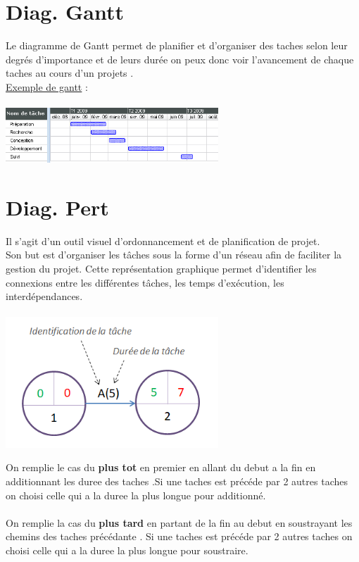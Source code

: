 \documentclass[a4paper,12pt,openany]{book}
\begin{document}
\chapter{Diag. Gantt}
Le diagramme de Gantt permet de planifier et d'organiser des taches selon leur degrés d'importance et de leurs durée on peux donc voir l'avancement de chaque taches au cours d'un projets .
\\
\underline{Exemple de gantt} :\\
\\
\includegraphics[width=0.60\textwidth,center]{img/gantt-diag.png}


\newpage

\chapter{Diag. Pert}

Il s'agit d'un outil visuel d'ordonnancement et de planification de projet.\\
Son but est d'organiser les tâches sous la forme d'un réseau afin de faciliter la gestion du projet. Cette représentation graphique permet d'identifier les connexions entre les différentes tâches, les temps d'exécution, les interdépendances.\\
\\
\includegraphics[width=0.60\textwidth,center]{img/pert-diag.png}

On remplie le cas du \textbf{plus tot} en premier en allant du debut a la fin en additionnant les duree des taches .Si une taches est précéde par 2 autres taches on choisi celle qui a la duree la plus longue pour additionné.\\
\\
On remplie la cas du \textbf{plus tard} en partant de la fin au debut en soustrayant les chemins des taches précédante . Si une taches est précéde par 2 autres taches on choisi celle qui a la duree la plus longue pour soustraire.\\
\end{document}
